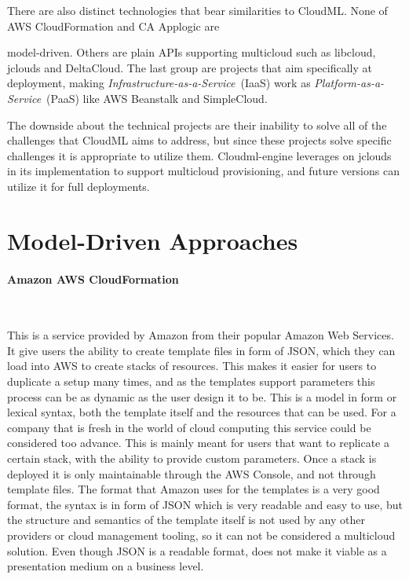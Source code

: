 There are also distinct technologies that bear similarities to CloudML.
None of AWS CloudFormation and CA Applogic are \begin{ii}\iitem model-driven.
Others are plain APIs supporting \iitem multicloud such as libcloud, jclouds and DeltaCloud.
The last group are projects that aim specifically at deployment, 
making \emph{Infrastructure-as-a-Service}~(IaaS) work as \emph{Platform-as-a-Service}~(PaaS)
like AWS Beanstalk and SimpleCloud.\end{ii}
The downside about the technical projects are their inability to solve all of the challenges
that CloudML aims to address, but since these projects solve specific
challenges it is appropriate to utilize them.
Cloudml-engine leverages on jclouds in its implementation to support multicloud provisioning,
and future versions can utilize it for full deployments.

\section{Model-Driven Approaches}

\paragraph{Amazon AWS CloudFormation}~\cite{aws}

This is a service provided by Amazon from their popular Amazon Web Services. 
It give users the ability to create template files in form of JSON, which they can load into AWS to create stacks of resources. 
This makes it easier for users to duplicate a setup many times, and as the templates support parameters this process 
can be as dynamic as the user design it to be. This is a model in form or lexical syntax, both the template itself and the resources that can be used.
For a company that is fresh in the world of cloud computing this service could be considered too advance. 
This is mainly meant for users that want to replicate a certain stack, with the ability to provide custom parameters. 
Once a stack is deployed it is only maintainable through the AWS Console, and not through template files. 
The format that Amazon uses for the templates is a very good format, the syntax is in form of JSON which is very readable and easy to use, 
but the structure and semantics of the template itself is not used by any other providers or cloud management tooling, 
so it can not be considered a multicloud solution. Even though JSON is a readable format, does not make it viable as a presentation medium on a business level.

